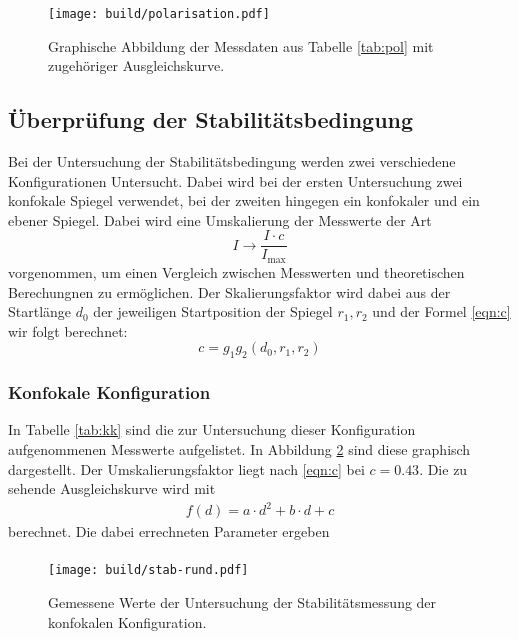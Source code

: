 \begin{figure}[htb]
  \centering
  \texttt{[image: build/polarisation.pdf]}
  \caption{Graphische Abbildung der Messdaten aus Tabelle \ref{tab:pol} mit zugehöriger Ausgleichskurve.}
  \label{plt:pol}
\end{figure}
\FloatBarrier


\FloatBarrier

\subsection{Überprüfung der Stabilitätsbedingung}
Bei der Untersuchung der Stabilitätsbedingung werden zwei verschiedene
Konfigurationen Untersucht. Dabei wird bei der ersten Untersuchung zwei
konfokale Spiegel verwendet, bei der zweiten hingegen ein konfokaler und
ein ebener Spiegel. Dabei wird eine Umskalierung der Messwerte der Art
\begin{equation*}
  I \rightarrow \frac{I \cdot c}{I_\text{max}}
\end{equation*}
vorgenommen, um einen Vergleich zwischen Messwerten und theoretischen
Berechungnen zu ermöglichen.
Der Skalierungsfaktor wird dabei aus der Startlänge $d_0$ der jeweiligen
Startposition der Spiegel $r_1, r_2$ und der Formel \ref{eqn:c} wir folgt
berechnet:
\begin{equation}
  c = g_1g_2(d_0,r_1,r_2)
  \label{eqn:c}
\end{equation}

\subsubsection{Konfokale Konfiguration}
In Tabelle \ref{tab:kk} sind die zur Untersuchung dieser Konfiguration
aufgenommenen Messwerte aufgelistet. In Abbildung \ref{plt:kk} sind diese
graphisch dargestellt. Der Umskalierungsfaktor liegt nach \ref{eqn:c} bei
$c = \num{0,43}$. Die zu sehende Ausgleichskurve wird mit
\begin{align*}
  f(d) = a\cdot d^2 + b\cdot d + c
\end{align*}
berechnet. Die dabei errechneten Parameter ergeben
\begin{align*}
\end{align*}

\begin{figure}[htb]
  \centering
  \texttt{[image: build/stab-rund.pdf]}
  \caption{Gemessene Werte der Untersuchung der Stabilitätsmessung der konfokalen Konfiguration. }
  \label{plt:kk}
\end{figure}
\FloatBarrier

